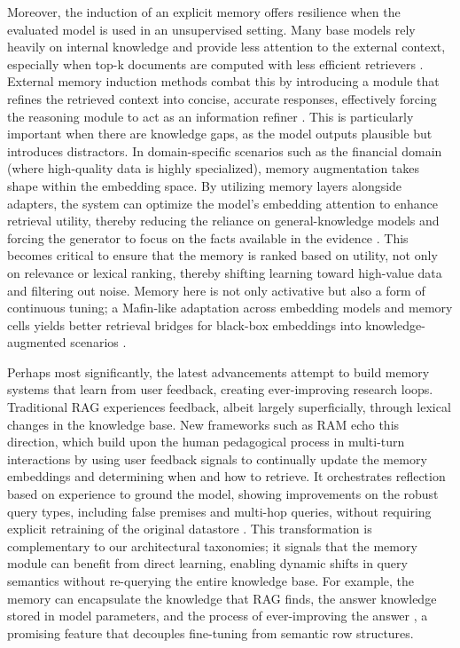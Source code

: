 \documentclass[11pt]{article}
\begin{document}
Moreover, the induction of an explicit memory offers resilience when the evaluated model is used in an unsupervised setting. Many base models rely heavily on internal knowledge and provide less attention to the external context, especially when top-k documents are computed with less efficient retrievers \cite{ref51}. External memory induction methods combat this by introducing a module that refines the retrieved context into concise, accurate responses, effectively forcing the reasoning module to act as an information refiner \cite{ref52}. This is particularly important when there are knowledge gaps, as the model outputs plausible but introduces distractors. In domain-specific scenarios such as the financial domain (where high-quality data is highly specialized), memory augmentation takes shape within the embedding space. By utilizing memory layers alongside adapters, the system can optimize the model's embedding attention to enhance retrieval utility, thereby reducing the reliance on general-knowledge models and forcing the generator to focus on the facts available in the evidence \cite{ref3,ref53}. This becomes critical to ensure that the memory is ranked based on utility, not only on relevance or lexical ranking, thereby shifting learning toward high-value data and filtering out noise. Memory here is not only activative but also a form of continuous tuning; a Mafin-like adaptation across embedding models and memory cells yields better retrieval bridges for black-box embeddings into knowledge-augmented scenarios \cite{ref54}.

Perhaps most significantly, the latest advancements attempt to build memory systems that learn from user feedback, creating ever-improving research loops. Traditional RAG experiences feedback, albeit largely superficially, through lexical changes in the knowledge base. New frameworks such as RAM echo this direction, which build upon the human pedagogical process in multi-turn interactions by using user feedback signals to continually update the memory embeddings and determining when and how to retrieve. It orchestrates reflection based on experience to ground the model, showing improvements on the robust query types, including false premises and multi-hop queries, without requiring explicit retraining of the original datastore \cite{ref55}. This transformation is complementary to our architectural taxonomies; it signals that the memory module can benefit from direct learning, enabling dynamic shifts in query semantics without re-querying the entire knowledge base. For example, the memory can encapsulate the knowledge that RAG finds, the answer knowledge stored in model parameters, and the process of ever-improving the answer \cite{ref52}, a promising feature that decouples fine-tuning from semantic row structures.
\end{document}
